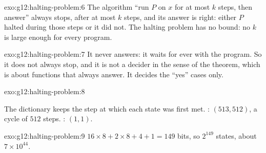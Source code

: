 \begin{solution}{exo:g12:halting-problem:6}
The algorithm ``run $P$ on $x$ for at most $k$ steps, then answer'' always stops, after at most $k$ steps, and its
answer is right: either $P$ halted during those steps or it did not. The halting problem has no bound: no $k$ is
large enough for every program.
\end{solution}

\begin{solution}{exo:g12:halting-problem:7}
It never answers: it waits for ever with the program. So it does not always stop, and it is not a decider in the
sense of the theorem, which is about functions that always answer. It decides the ``yes'' cases only.
\end{solution}

\begin{solution}{exo:g12:halting-problem:8}
\smallskip\noindent\hspace*{2em}

\noindent\hspace*{4em}

\noindent\hspace*{4em}

\noindent\hspace*{6em}

\noindent\hspace*{6em}

\noindent\hspace*{8em}

\noindent\hspace*{6em}

\noindent\hspace*{6em}

\noindent\hspace*{4em}

\smallskip\noindent The dictionary keeps the step at which each state was first met. : $(513, 512)$, a
cycle of $512$ steps. : $(1, 1)$.
\end{solution}

\begin{solution}{exo:g12:halting-problem:9}
$16 \times 8 + 2 \times 8 + 4 + 1 = 149$ bits, so $2^{149}$ states, about $7 \times 10^{44}$.
\end{solution}

